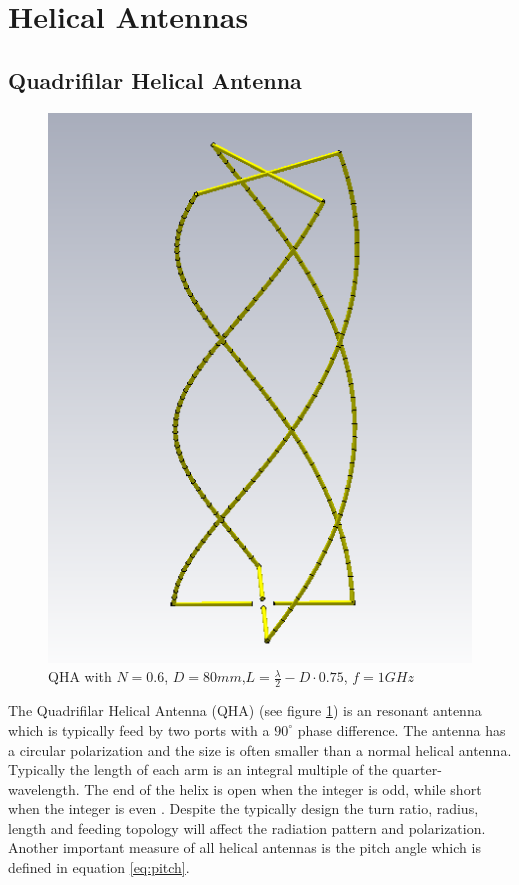 \section{Helical Antennas}

\subsection{Quadrifilar Helical Antenna}

\begin{figure}[H]
\centering 
\includegraphics[scale = 0.7]{figures/antennas/qha/qha_6_1mhz}
\caption{QHA with $N=0.6$, $D=80mm$,$L=\frac{\lambda}{2}-D\cdot 0.75$, $f=1GHz$}
\label{fig:QHA1}
\end{figure}

The Quadrifilar Helical Antenna (QHA) (see figure \ref{fig:QHA1}) is an resonant antenna which is typically feed by two ports with a $90^\circ$ phase difference. The antenna has a circular polarization and the size is often smaller than a normal helical antenna. Typically the length of each arm is an integral multiple of the quarter-wavelength. The end of the helix
is open when the integer is odd, while short when the integer is
even \citep{Bai2014}. Despite the typically design the turn ratio, radius, length and feeding topology will affect the radiation pattern and polarization. Another important measure of all helical antennas is the pitch angle which is defined in equation \ref{eq:pitch}.

